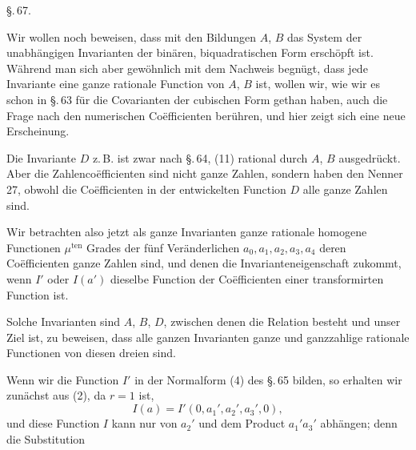 \begin{center}
\S.\,67.

\end{center}

Wir wollen noch beweisen, dass mit den Bildungen $A$, $B$ das System der
unabhängigen Invarianten der binären, biquadratischen Form erschöpft ist.
Während man sich aber gewöhnlich mit dem Nachweis begnügt, dass jede
Invariante eine ganze rationale Function von $A$, $B$ ist, wollen wir, wie wir
es schon in \S.\,63 für die Covarianten der cubischen Form gethan haben, auch
die Frage nach den numerischen Co\"efficienten berühren, und hier zeigt sich
eine neue Erscheinung.

Die Invariante $D$ z.\,B. ist zwar nach \S.\,64, (11) rational durch $A$, $B$
ausgedrückt. Aber die Zahlenco\"efficienten sind nicht ganze Zahlen, sondern
haben den Nenner 27, obwohl die Co\"efficienten in der entwickelten Function
$D$ alle ganze Zahlen sind.

Wir betrachten also jetzt als ganze Invarianten ganze rationale homogene
Functionen $\mu^{\mathrm{ten}}$ Grades der fünf Veränderlichen $a_0, a_1, a_2, a_3, a_4$
deren Co\"efficienten ganze Zahlen sind, und denen die Invarianteneigenschaft
zukommt, wenn $I'$ oder $I(a')$ dieselbe Function der Co\"efficienten einer
transformirten Function ist.

Solche Invarianten sind $A$, $B$, $D$, zwischen denen die Relation besteht
und unser Ziel ist, zu beweisen, dass alle ganzen Invarianten ganze und
ganzzahlige rationale Functionen von diesen dreien sind.

Wenn wir die Function $I'$ in der Normalform (4) des \S.\,65 bilden, so
erhalten wir zunächst aus (2), da $r = 1$ ist,
\[
I(a) = I'(0, a_1', a_2', a_3', 0),
\]
und diese Function $I$ kann nur von $a_2'$ und dem Product $a_1'a_3'$
abhängen; denn die Substitution
